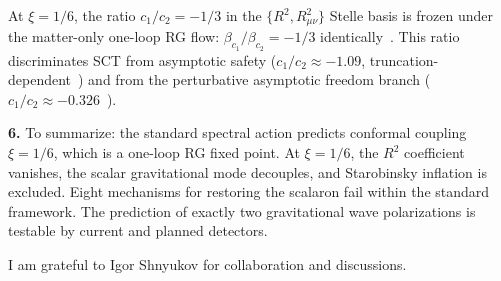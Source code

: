 \documentclass[12pt]{article}
\begin{document}
At $\xi = 1/6$, the ratio $c_1/c_2 = -1/3$ in the
$\{R^2, R_{\mu\nu}^2\}$ Stelle basis is frozen under the
matter-only one-loop RG flow:
$\beta_{c_1}/\beta_{c_2} = -1/3$
identically~\cite{Alfyorov:2026paper1}.  This ratio
discriminates SCT from asymptotic safety ($c_1/c_2 \approx
-1.09$, truncation-dependent~\cite{BMS:2009}) and from the
perturbative asymptotic freedom branch
($c_1/c_2 \approx -0.326$~\cite{Shapiro:2004}).

\medskip

\noindent\textbf{6.}
To summarize: the standard spectral action predicts conformal
coupling $\xi = 1/6$, which is a one-loop RG fixed point.
At $\xi = 1/6$, the $R^2$ coefficient vanishes, the scalar
gravitational mode decouples, and Starobinsky inflation is
excluded.  Eight mechanisms for restoring the scalaron fail
within the standard framework.  The prediction of exactly two
gravitational wave polarizations is testable by current and
planned detectors.

\bigskip

I am grateful to Igor Shnyukov for collaboration and discussions.
\end{document}

